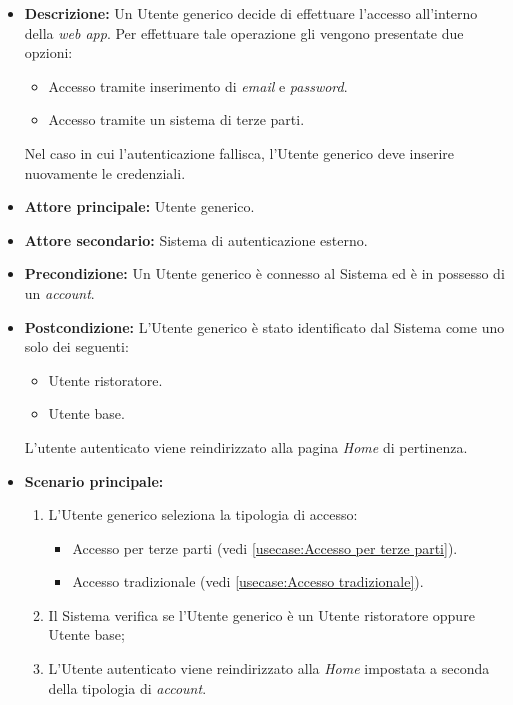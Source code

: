 \label{usecase:Effettua accesso}

\begin{itemize}
	\item \textbf{Descrizione:} Un Utente generico decide di effettuare l'accesso all'interno della \textit{web app}. Per effettuare tale
	operazione gli vengono presentate due opzioni:
	\begin{itemize}
		\item Accesso tramite inserimento di \textit{email} e \textit{password}.
		\item Accesso tramite un sistema di terze parti.
	\end{itemize}
	Nel caso in cui l'autenticazione fallisca, l'Utente generico deve inserire nuovamente le credenziali.

	\item \textbf{Attore principale:} Utente generico.
	\item \textbf{Attore secondario:} Sistema di autenticazione esterno.
	\item \textbf{Precondizione:}
	      Un Utente generico è connesso al Sistema ed è in possesso di un \textit{account}.
	\item \textbf{Postcondizione:}
	      L'Utente generico è stato identificato dal Sistema come uno solo dei seguenti:
	      \begin{itemize}
		      \item Utente ristoratore.
		      \item Utente base.
	      \end{itemize}
		  L'utente autenticato viene reindirizzato alla pagina \textit{Home} di pertinenza.

	\item \textbf{Scenario principale:}
	      \begin{enumerate}
		      \item L'Utente generico seleziona la tipologia di accesso: 

			  \begin{itemize}
				\item Accesso per terze parti (vedi \autoref{usecase:Accesso per terze parti}).
				\item Accesso tradizionale (vedi \autoref{usecase:Accesso tradizionale}).
			  \end{itemize}

		      \item Il Sistema verifica se l'Utente generico è un Utente ristoratore oppure Utente base;
		      \item L'Utente autenticato viene reindirizzato alla \textit{Home} impostata a seconda della tipologia di \textit{account}.		
	      \end{enumerate}
		

\end{itemize}
